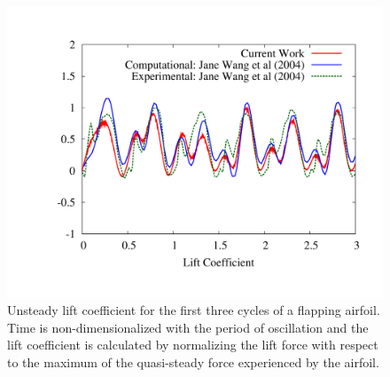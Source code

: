 \documentclass{tufte-handout}
\begin{document}
\begin{figure}
\centering
    \includegraphics[width=0.75\linewidth]{flapCl.pdf}
    \caption{Unsteady lift coefficient for the first three cycles of a flapping airfoil. Time is non-dimensionalized with the  period of oscillation and the lift coefficient is calculated by normalizing the lift force with respect to the maximum of the quasi-steady force experienced by the airfoil.}
    \label{fig:flapCl}
\end{figure}
\end{document}
